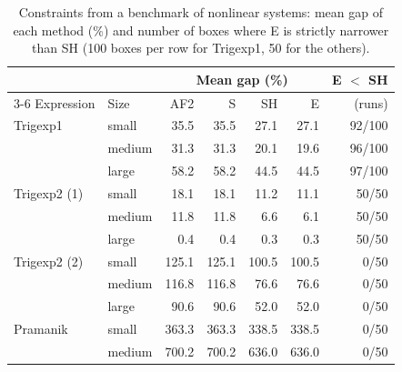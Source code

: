 \begin{table}[t]
\centering
\caption{Constraints from a benchmark of nonlinear systems: mean gap of each method (\%) and number of boxes where E is strictly narrower than SH (100 boxes per row for Trigexp1, 50 for the others).}
\label{tab:instances}
\small
\setlength{\tabcolsep}{4pt}
\begin{tabular}{llrrrrr}
\toprule
 & & \multicolumn{4}{c}{Mean gap (\%)} & E $<$ SH \\
\cmidrule(lr){3-6}
Expression & Size & AF2 & S & SH & E & (runs) \\
\midrule
Trigexp1 & small & 35.5 & 35.5 & 27.1 & 27.1 & 92/100 \\
 & medium & 31.3 & 31.3 & 20.1 & 19.6 & 96/100 \\
 & large & 58.2 & 58.2 & 44.5 & 44.5 & 97/100 \\
\midrule
Trigexp2 (1) & small & 18.1 & 18.1 & 11.2 & 11.1 & 50/50 \\
 & medium & 11.8 & 11.8 & 6.6 & 6.1 & 50/50 \\
 & large & 0.4 & 0.4 & 0.3 & 0.3 & 50/50 \\
\midrule
Trigexp2 (2) & small & 125.1 & 125.1 & 100.5 & 100.5 & 0/50 \\
 & medium & 116.8 & 116.8 & 76.6 & 76.6 & 0/50 \\
 & large & 90.6 & 90.6 & 52.0 & 52.0 & 0/50 \\
\midrule
Pramanik & small & 363.3 & 363.3 & 338.5 & 338.5 & 0/50 \\
 & medium & 700.2 & 700.2 & 636.0 & 636.0 & 0/50 \\
\bottomrule
\end{tabular}
\end{table}